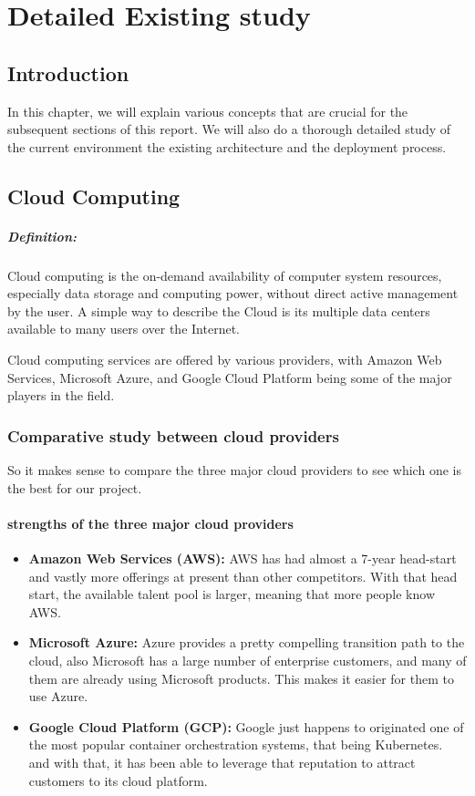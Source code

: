 \chapter{Detailed Existing study}

\section*{Introduction}
In this chapter, we will explain various concepts that are crucial for the subsequent sections of this report. We will also do a thorough detailed study of the current environment the existing architecture and the deployment process.

\section{Cloud Computing}
\paragraph*{Definition:}
Cloud computing is the on-demand availability of computer system resources, especially data storage and computing power, without direct active management by the user. A simple way to describe the Cloud is its multiple data centers available to many users over the Internet.
\par
\noindent
Cloud computing services are offered by various providers, with Amazon Web Services, Microsoft Azure, and Google Cloud Platform being some of the major players in the field.
\subsection*{Comparative study between cloud providers}
So it makes sense to compare the three major cloud providers to see which one is the best for our project.
\subsubsection*{strengths of the three major cloud providers \cite{webArticle1}}
\begin{itemize}
    \item \textbf{Amazon Web Services (AWS):} AWS has had almost a 7-year head-start and vastly more offerings at present than other competitors. With that head start, the available talent pool is larger, meaning that more people know AWS.
    \item \textbf{Microsoft Azure:} Azure provides a pretty compelling transition path to the cloud, also Microsoft has a large number of enterprise customers, and many of them are already using Microsoft products. This makes it easier for them to use Azure.
    \item \textbf{Google Cloud Platform (GCP):} Google just happens to originated one of the most popular container orchestration systems, that being Kubernetes. and with that, it has been able to leverage that reputation to attract customers to its cloud platform.
\end{itemize}
